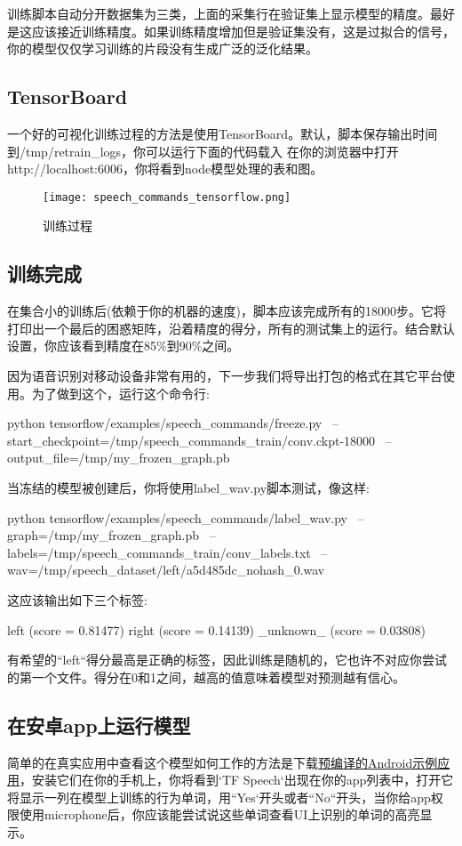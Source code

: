 训练脚本自动分开数据集为三类，上面的采集行在验证集上显示模型的精度。最好是这应该接近训练精度。如果训练精度增加但是验证集没有，这是过拟合的信号，你的模型仅仅学习训练的片段没有生成广泛的泛化结果。
\subsection{TensorBoard}
一个好的可视化训练过程的方法是使用TensorBoard。默认，脚本保存输出时间到/tmp/retrain\_logs，你可以运行下面的代码载入\newline
{}\newline
在你的浏览器中打开http://localhost:6006，你将看到node模型处理的表和图。
\begin{figure}[H]
\centering
\texttt{[image: speech\_commands\_tensorflow.png]}
\caption{训练过程}
\end{figure}
\subsection{训练完成}
在集合小的训练后(依赖于你的机器的速度)，脚本应该完成所有的18000步。它将打印出一个最后的困惑矩阵，沿着精度的得分，所有的测试集上的运行。结合默认设置，你应该看到精度在85\%到90\%之间。

因为语音识别对移动设备非常有用的，下一步我们将导出打包的格式在其它平台使用。为了做到这个，运行这个命令行:
\begin{bashcode}
python tensorflow/examples/speech_commands/freeze.py \
--start_checkpoint=/tmp/speech_commands_train/conv.ckpt-18000 \
--output_file=/tmp/my_frozen_graph.pb
\end{bashcode}
当冻结的模型被创建后，你将使用label\_wav.py脚本测试，像这样:
\begin{python}
python tensorflow/examples/speech_commands/label_wav.py \
--graph=/tmp/my_frozen_graph.pb \
--labels=/tmp/speech_commands_train/conv_labels.txt \
--wav=/tmp/speech_dataset/left/a5d485dc_nohash_0.wav 
\end{python}
这应该输出如下三个标签:
\begin{textcode}
left (score = 0.81477)
right (score = 0.14139)
_unknown_ (score = 0.03808)
\end{textcode}
有希望的``left``得分最高是正确的标签，因此训练是随机的，它也许不对应你尝试的第一个文件。得分在0和1之间，越高的值意味着模型对预测越有信心。
\subsection{在安卓app上运行模型}
简单的在真实应用中查看这个模型如何工作的方法是下载\href{https://github.com/tensorflow/tensorflow/tree/master/tensorflow/examples/android#prebuilt-components}{预编译的Android示例应用}，安装它们在你的手机上，你将看到`TF Speech`出现在你的app列表中，打开它将显示一列在模型上训练的行为单词，用``Yes`开头或者``No``开头，当你给app权限使用microphone后，你应该能尝试说这些单词查看UI上识别的单词的高亮显示。

